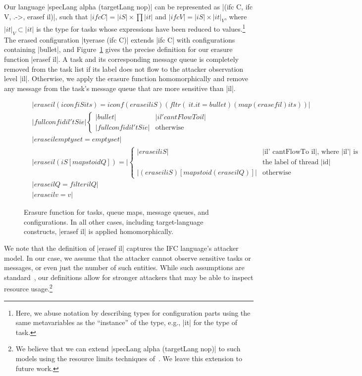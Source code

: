 Our language |specLang alpha (targetLang nop)| can be
represented as |(ifc C, ifc V, .->, erasef il)|, such that
$|ifc C| = |iS| \times \prod |it|$ and
$|ifc V| = |iS| \times |it|_V$, where $|it|_V \subset |it|$ is the
type for tasks whose expressions have been reduced to
values.\footnote{
  Here, we abuse notation by describing types for configuration parts using the
  same metavariables as the ``instance'' of the type, e.g., |it| for the type of
  task.
}
The erased configuration |tyerase (ifc C)| extends |ifc C| with configurations
containing |bullet|, and Figure~\ref{fig:erasure} gives the precise definition for
our erasure function |erasef il|.
%
A task and its corresponding message queue is completely removed from the task
list if its label does not flow to the attacker observation level |il|.
Otherwise, we apply the erasure function homomorphically and remove any message
from the task's message queue that are more sensitive than |il|.

\begin{figure} %
\begin{align*}
  &|erase il (iconf iS its) =
  iconf (erase il iS) (fltr (\ it . it = bullet) (map (erasef il) its))|\\
  &|fullconf id il' tS ie| \begin{cases}
    |bullet| & |il' cantFlowTo il| \\
    |fullconf id il' tS ie| & \text{otherwise}
  \end{cases} \\
  &|erase il emptyset = emptyset|\\
  &|erase il (iS [mapsto id Q]) =| \begin{cases}
    |erase il iS| & \text{|il' cantFlowTo il|, where |il'| is}\\
    & \text{the label of thread |id|} \\
    |(erase il iS) [mapsto id (erase il Q)]| & \text{otherwise}
  \end{cases} \\
  &|erase il Q = filter il Q|\\
  &|erase il v = v|
\end{align*}
\caption{ Erasure function for tasks, queue maps, message queues, and
configurations.  In all other cases, including target-language constructs,
|erasef il| is applied homomorphically.  \label{fig:erasure} }
\end{figure}

We note that the definition of |erasef il| captures the IFC
language's attacker model. 
%
In our case, we assume that the attacker cannot observe sensitive tasks or
messages, or even just the number of such entities.
%
While such assumptions are standard~\tocite{}, our definitions allow for
stronger attackers that may be able to inspect resource usage.\footnote{
  We believe that we can extend |specLang alpha (targetLang nop)| to
  such models using the resource limits techniques of~\tocite{}.
  We leave this extension to future work.
}

